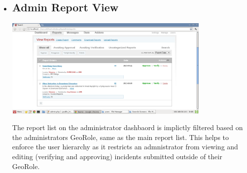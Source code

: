 \documentclass{article}
\begin{document}
\begin{itemize}
\item \subsection{Admin Report View}
\begin{minipage}{\linewidth}
  \centering
  \includegraphics[width=100mm]{admin_dashboard_reports_list.png}
\end{minipage}
The report list on the administrator dashbaord is implictly filtered based on the administrators GeoRole, same as the main report list.  This helps to enforce the user hierarchy as it restricts an admnistrator from viewing and editing (verifying and approving) incidents submitted outside of their GeoRole.
\end{itemize}
\end{document}
